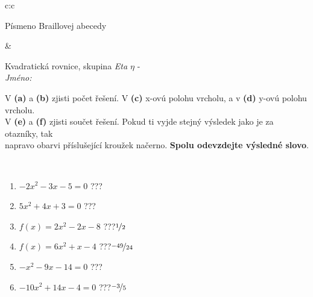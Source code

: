 \documentclass[10pt]{report}
\begin{document}
\begin{tabular}{c:c}
\begin{minipage}[c][104.5mm][t]{0.5\linewidth}
\begin{center}
\begin{minipage}{0.20\linewidth}
\begin{center}
{\small Písmeno Braillovej abecedy}
\end{center}
\end{minipage}
\end{center}
\end{minipage}
&
\begin{minipage}[c][104.5mm][t]{0.5\linewidth}
\begin{center}
\vspace{7mm}
{\huge Kvadratická rovnice, skupina \textit{Eta $\eta$} -}\\[5mm]
\textit{Jméno:}\phantom{xxxxxxxxxxxxxxxxxxxxxxxxxxxxxxxxxxxxxxxxxxxxxxxxxxxxxxxxxxxxxxxxx}\\[5mm]
\begin{minipage}{0.95\linewidth}
\begin{center}
V \textbf{(a)} a \textbf{(b)} zjisti počet řešení. V \textbf{(c)} x-ovú polohu vrcholu, a v \textbf{(d)} y-ovú polohu vrcholu.\\V \textbf{(e)} a \textbf{(f)} zjisti součet řešení. Pokud ti vyjde stejný výsledek jako je za otazníky, tak\\napravo obarvi příslušející kroužek načerno. \textbf{Spolu odevzdejte výsledné slovo}.
\end{center}
\end{minipage}
\\[1mm]
\begin{minipage}{0.79\linewidth}
\begin{center}
\begin{varwidth}{\linewidth}
\begin{enumerate}
\Large
\item $-2x^2-3x-5=0$\quad \dotfill\; ???\;\dotfill {}
\item $5x^2+4x+3=0$\quad \dotfill\; ???\;\dotfill {}
\item $f(x)=2x^2-2x-8$\quad \dotfill\; ???\;\dotfill \quad $\nicefrac{1}{2}$
\item $f(x)=6x^2+x-4$\quad \dotfill\; ???\;\dotfill \quad $\nicefrac{-49}{24}$
\item $-x^2-9x-14=0$\quad \dotfill\; ???\;\dotfill {}
\item $-10x^2+14x-4=0$\quad \dotfill\; ???\;\dotfill \quad $\nicefrac{-3}{5}$
\end{enumerate}
\end{varwidth}
\end{center}
\end{minipage}
\begin{minipage}{0.20\linewidth}

\end{minipage}
\end{center}
\end{minipage}
\end{tabular}
\end{document}
